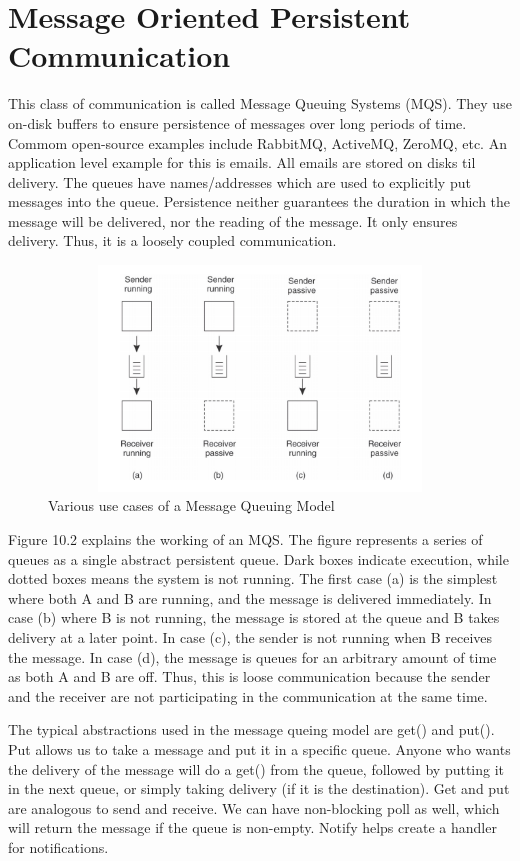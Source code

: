 \documentclass[twoside]{article}
\begin{document}
\section{Message Oriented Persistent Communication}
This class of communication is called Message Queuing Systems (MQS). They use on-disk buffers to ensure persistence of messages over long periods of time. Commom open-source examples include RabbitMQ, ActiveMQ, ZeroMQ, etc. An application level example for this is emails. All emails are stored on disks til delivery. The queues have names/addresses which are used to explicitly put messages into the queue. Persistence neither guarantees the duration in which the message will be delivered, nor the reading of the message. It only ensures delivery. Thus, it is a loosely coupled communication. 

\begin{figure}
\includegraphics[width=15cm, height=6cm]{Selection_004}
\centering
\caption{Various use cases of a Message Queuing Model }
\end{figure}

Figure 10.2 explains the working of an MQS. The figure represents a series of queues as a single abstract persistent queue. Dark boxes indicate execution, while dotted boxes means the system is not running. The first case (a) is the simplest where both A and B are running, and the message is delivered immediately. In case (b) where B is not running, the message is stored at the queue and B takes delivery at a later point. In case (c), the sender is not running when B receives the message. In case (d), the message is queues for an arbitrary amount of time as both A and B are off. Thus, this is loose communication because the sender and the receiver are not participating in the communication at the same time.

The typical abstractions used in the message queing model are get() and put(). Put allows us to take a message and put it in a specific queue. Anyone who wants the delivery of the message will do a get() from the queue, followed by putting it in the next queue, or simply taking delivery (if it is the destination). Get and put are analogous to send and receive. We can have non-blocking poll as well, which will return the message if the queue is non-empty. Notify helps create a handler for notifications.
\end{document}
